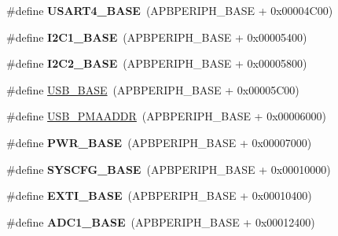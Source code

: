 \begin{DoxyCompactItemize}
\item 
\mbox{\label{group___peripheral__memory__map_gafa384bb1e7d610a806f7c1f1dbc72ac5}} 
\#define {\bfseries U\+S\+A\+R\+T4\+\_\+\+B\+A\+SE}~(A\+P\+B\+P\+E\+R\+I\+P\+H\+\_\+\+B\+A\+SE + 0x00004\+C00)
\item 
\mbox{\label{group___peripheral__memory__map_gacd72dbffb1738ca87c838545c4eb85a3}} 
\#define {\bfseries I2\+C1\+\_\+\+B\+A\+SE}~(A\+P\+B\+P\+E\+R\+I\+P\+H\+\_\+\+B\+A\+SE + 0x00005400)
\item 
\mbox{\label{group___peripheral__memory__map_ga04bda70f25c795fb79f163b633ad4a5d}} 
\#define {\bfseries I2\+C2\+\_\+\+B\+A\+SE}~(A\+P\+B\+P\+E\+R\+I\+P\+H\+\_\+\+B\+A\+SE + 0x00005800)
\item 
\#define \hyperlink{group___peripheral__memory__map_gaa6c4cbed4ddbb3ecd77de93fab2a2e04}{U\+S\+B\+\_\+\+B\+A\+SE}~(A\+P\+B\+P\+E\+R\+I\+P\+H\+\_\+\+B\+A\+SE + 0x00005\+C00)
\item 
\#define \hyperlink{group___peripheral__memory__map_gaf992dfdd5707568c5cb5506e2347e808}{U\+S\+B\+\_\+\+P\+M\+A\+A\+D\+DR}~(A\+P\+B\+P\+E\+R\+I\+P\+H\+\_\+\+B\+A\+SE + 0x00006000)
\item 
\mbox{\label{group___peripheral__memory__map_gac691ec23dace8b7a649a25acb110217a}} 
\#define {\bfseries P\+W\+R\+\_\+\+B\+A\+SE}~(A\+P\+B\+P\+E\+R\+I\+P\+H\+\_\+\+B\+A\+SE + 0x00007000)
\item 
\mbox{\label{group___peripheral__memory__map_ga62246020bf3b34b6a4d8d0e84ec79d3d}} 
\#define {\bfseries S\+Y\+S\+C\+F\+G\+\_\+\+B\+A\+SE}~(A\+P\+B\+P\+E\+R\+I\+P\+H\+\_\+\+B\+A\+SE + 0x00010000)
\item 
\mbox{\label{group___peripheral__memory__map_ga87371508b3bcdcd98cd1ec629be29061}} 
\#define {\bfseries E\+X\+T\+I\+\_\+\+B\+A\+SE}~(A\+P\+B\+P\+E\+R\+I\+P\+H\+\_\+\+B\+A\+SE + 0x00010400)
\item 
\mbox{\label{group___peripheral__memory__map_ga695c9a2f892363a1c942405c8d351b91}} 
\#define {\bfseries A\+D\+C1\+\_\+\+B\+A\+SE}~(A\+P\+B\+P\+E\+R\+I\+P\+H\+\_\+\+B\+A\+SE + 0x00012400)

\end{DoxyCompactItemize}
